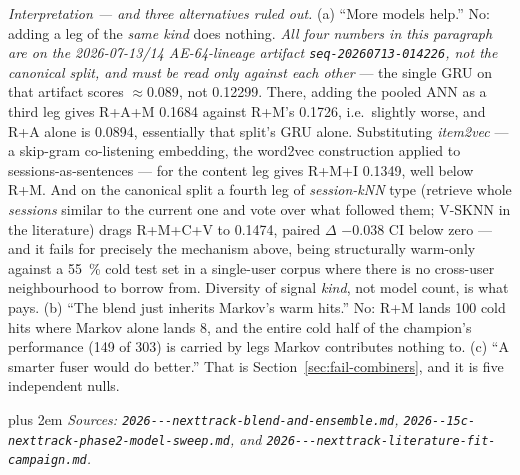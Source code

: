 \documentclass[11pt]{article}
\newcommand{\dsid}[1]{\texttt{\small #1}}
\begin{document}
\emph{Interpretation --- and three alternatives ruled out.} (a) ``More models
help.'' No: adding a leg of the \emph{same kind} does nothing.
\emph{All four numbers in this paragraph are on the 2026-07-13/14
AE-64-lineage artifact \dsid{seq-20260713-014226}, not the canonical split, and
must be read only against each other} --- the single GRU on that artifact scores
${\approx}\num{0.089}$, not \num{0.12299}. There, adding the pooled ANN as a
third leg gives R+A+M \num{0.1684} against R+M's \num{0.1726}, i.e.\ slightly
worse, and R+A alone is \num{0.0894}, essentially that split's GRU alone.
Substituting \emph{item2vec} --- a skip-gram co-listening embedding, the
word2vec construction applied to sessions-as-sentences --- for the content leg
gives R+M+I \num{0.1349}, well below R+M. And on the canonical split a fourth
leg of \emph{session-kNN} type (retrieve whole \emph{sessions} similar to the
current one and vote over what followed them; V-SKNN in the literature) drags
R+M+C+V to \num{0.1474}, paired $\Delta$ $-\num{0.038}$ CI below zero --- and it
fails for precisely the mechanism above, being structurally warm-only against a
\SI{55}{\percent} cold test set in a single-user corpus where there is no
cross-user neighbourhood to borrow from. Diversity of signal \emph{kind}, not
model count, is what pays. (b) ``The blend just inherits
Markov's warm hits.'' No: R+M lands \num{100} cold hits where Markov alone lands
\num{8}, and the entire cold half of the champion's performance (\num{149} of
\num{303}) is carried by legs Markov contributes nothing to. (c) ``A smarter
fuser would do better.'' That is Section~\ref{sec:fail-combiners}, and it is
five independent nulls.

{\rightskip=0pt plus 2em \emph{Sources: \texttt{2026---\allowbreak nexttrack-\allowbreak blend-\allowbreak and-\allowbreak ensemble.md},
\texttt{2026--\allowbreak 15c-\allowbreak nexttrack-\allowbreak phase2-\allowbreak model-\allowbreak sweep.md},
and \texttt{2026---\allowbreak nexttrack-\allowbreak literature-\allowbreak fit-\allowbreak campaign.md}.}\par}
\end{document}
